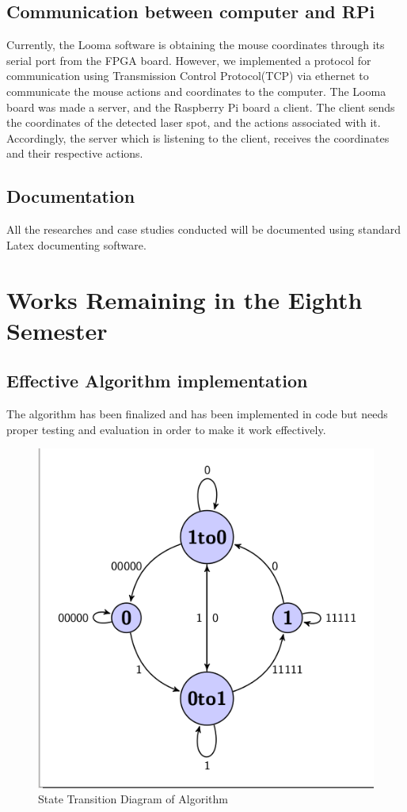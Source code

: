 \documentclass[12pt, a4paper]{article}
\begin{document}
\subsection{Communication between computer and RPi}
	Currently, the Looma software is obtaining the mouse coordinates through its serial port from the FPGA board. However, we implemented a protocol for communication using Transmission Control Protocol(TCP) via ethernet to communicate the mouse actions and coordinates to the computer. The Looma board was made a server, and the Raspberry Pi board a client. The client sends the coordinates of the detected laser spot, and the actions associated with it. Accordingly, the server which is listening to the client, receives the coordinates and their respective actions. 

\subsection{Documentation}
	All the researches and case studies conducted will be documented using standard Latex documenting software.

\newpage
\section{Works Remaining in the Eighth Semester}
\subsection{Effective Algorithm implementation}
	The algorithm has been finalized and has been implemented in code but needs proper testing and evaluation in order to make it work effectively.

\begin{figure}[htp]
\centering
\includegraphics[scale=0.3]{state.png}
\caption{State Transition Diagram of Algorithm}
\label{}
\end{figure}
\end{document}
